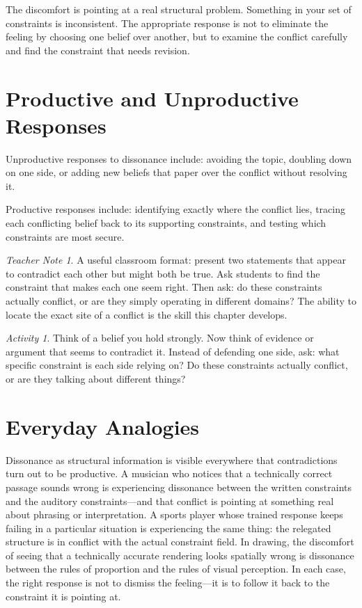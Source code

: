 \documentclass[11pt]{book}
\theoremstyle{definition}
\theoremstyle{remark}
\newtheorem{activity}[definition]{Activity}
\newtheorem{teachernote}{Teacher Note}[chapter]
\begin{document}
The discomfort is pointing at a real structural problem. Something in your
set of constraints is inconsistent. The appropriate response is not to
eliminate the feeling by choosing one belief over another, but to examine
the conflict carefully and find the constraint that needs revision.

\section{Productive and Unproductive Responses}

Unproductive responses to dissonance include: avoiding the topic, doubling
down on one side, or adding new beliefs that paper over the conflict without
resolving it.

Productive responses include: identifying exactly where the conflict lies,
tracing each conflicting belief back to its supporting constraints, and
testing which constraints are most secure.

\begin{teachernote}
A useful classroom format: present two statements that appear to contradict
each other but might both be true. Ask students to find the constraint
that makes each one seem right. Then ask: do these constraints actually
conflict, or are they simply operating in different domains? The ability
to locate the exact site of a conflict is the skill this chapter develops.
\end{teachernote}

\begin{activity}
Think of a belief you hold strongly. Now think of evidence or argument that
seems to contradict it. Instead of defending one side, ask: what specific
constraint is each side relying on? Do these constraints actually conflict,
or are they talking about different things?
\end{activity}

\section*{Everyday Analogies}

Dissonance as structural information is visible everywhere that
contradictions turn out to be productive. A musician who notices that
a technically correct passage sounds wrong is experiencing dissonance
between the written constraints and the auditory constraints---and that
conflict is pointing at something real about phrasing or interpretation.
A sports player whose trained response keeps failing in a particular
situation is experiencing the same thing: the relegated structure is
in conflict with the actual constraint field. In drawing, the discomfort
of seeing that a technically accurate rendering looks spatially wrong
is dissonance between the rules of proportion and the rules of visual
perception. In each case, the right response is not to dismiss the
feeling---it is to follow it back to the constraint it is pointing at.
\end{document}
